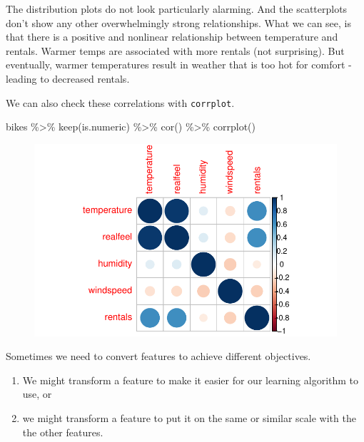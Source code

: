 \documentclass[
  letterpaper,
  DIV=11,
  numbers=noendperiod]{scrartcl}
\newenvironment{Shaded}{\begin{snugshade}}{\end{snugshade}}
\newcommand{\FunctionTok}[1]{\textcolor[rgb]{0.28,0.35,0.67}{#1}}
\newcommand{\NormalTok}[1]{\textcolor[rgb]{0.00,0.23,0.31}{#1}}
\newcommand{\SpecialCharTok}[1]{\textcolor[rgb]{0.37,0.37,0.37}{#1}}
\providecommand{\tightlist}{%
  \setlength{\itemsep}{0pt}\setlength{\parskip}{0pt}}\usepackage{longtable,booktabs,array}
\begin{document}
The distribution plots do not look particularly alarming. And the
scatterplots don't show any other overwhelmingly strong relationships.
What we can see, is that there is a positive and nonlinear relationship
between temperature and rentals. Warmer temps are associated with more
rentals (not surprising). But eventually, warmer temperatures result in
weather that is too hot for comfort - leading to decreased rentals.

We can also check these correlations with \texttt{corrplot}.

\begin{Shaded}
\begin{Highlighting}[]
\NormalTok{bikes }\SpecialCharTok{\%\textgreater{}\%}
  \FunctionTok{keep}\NormalTok{(is.numeric) }\SpecialCharTok{\%\textgreater{}\%}
  \FunctionTok{cor}\NormalTok{() }\SpecialCharTok{\%\textgreater{}\%}
  \FunctionTok{corrplot}\NormalTok{()}
\end{Highlighting}
\end{Shaded}

\begin{figure}[H]

{\centering \includegraphics{index_files/figure-pdf/unnamed-chunk-14-1.pdf}

}

\end{figure}

Sometimes we need to convert features to achieve different objectives.

\begin{enumerate}
\def\labelenumi{\arabic{enumi}.}
\tightlist
\item
  We might transform a feature to make it easier for our learning
  algorithm to use, or
\item
  we might transform a feature to put it on the same or similar scale
  with the the other features.
\end{enumerate}
\end{document}
